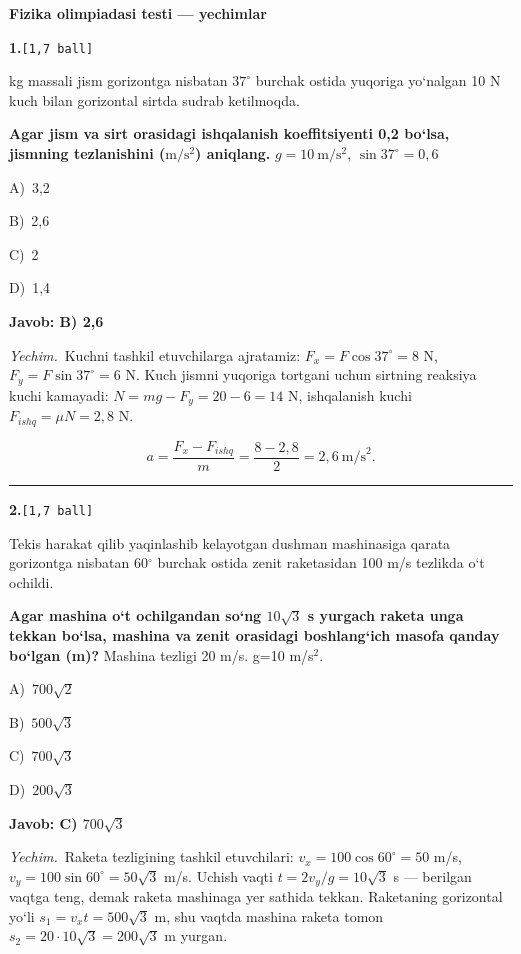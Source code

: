 \documentclass[11pt,a4paper]{article}
\newcommand{\ball}[1]{\hfill\texttt{[#1 ball]}}
\newcommand{\qhead}[2]{\Needspace{10\baselineskip}\noindent\textbf{#1.}\ball{#2}\par\nopagebreak}
\newcommand{\opt}[2]{\hspace*{8mm}#1)\ #2\par}
\newenvironment{qbody}{\begin{list}{}{\leftmargin=8mm\rightmargin=0pt\topsep=0pt\itemsep=0pt\parsep=3pt}\item\relax}{\end{list}}
\begin{document}
\begin{center}{\Large\textbf{Fizika olimpiadasi testi — yechimlar}}\end{center}\medskip
\noindent\begin{minipage}{\linewidth}
\qhead{1}{1,7}
\begin{qbody}
2 kg massali jism gorizontga nisbatan $37^\circ$ burchak ostida yuqoriga yo‘nalgan 10 N kuch bilan gorizontal sirtda sudrab ketilmoqda.\par
\textbf{Agar jism va sirt orasidagi ishqalanish koeffitsiyenti 0,2 bo‘lsa, jismning tezlanishini ($\mathrm{m/s^2}$) aniqlang.} $g=10\ \mathrm{m/s^2}$, $\sin37^\circ=0{,}6$\par
\smallskip
\opt{A}{3,2}
\opt{B}{2,6}
\opt{C}{2}
\opt{D}{1,4}
\end{qbody}\end{minipage}\par\vspace{2pt}
\noindent\colorbox{gray!12}{\parbox{\dimexpr\linewidth-2\fboxsep}{\textbf{Javob: B) 2,6}}}\par\smallskip
\noindent\textit{Yechim.}\ Kuchni tashkil etuvchilarga ajratamiz: $F_x=F\cos37^\circ=8$ N, $F_y=F\sin37^\circ=6$ N. Kuch jismni yuqoriga tortgani uchun sirtning reaksiya kuchi kamayadi: $N=mg-F_y=20-6=14$ N, ishqalanish kuchi $F_{ishq}=\mu N=2{,}8$ N.\par
\[a=\frac{F_x-F_{ishq}}{m}=\frac{8-2{,}8}{2}=2{,}6\ \text{m/s}^2.\]\par\medskip\hrule\medskip
\noindent\begin{minipage}{\linewidth}
\qhead{2}{1,7}
\begin{qbody}
Tekis harakat qilib yaqinlashib kelayotgan dushman mashinasiga qarata gorizontga nisbatan 60$^\circ$ burchak ostida zenit raketasidan 100 m/s tezlikda o‘t ochildi.\par
\textbf{Agar mashina o‘t ochilgandan so‘ng $10\sqrt3$ s yurgach raketa unga tekkan bo‘lsa, mashina va zenit orasidagi boshlang‘ich masofa qanday bo‘lgan (m)?} Mashina tezligi 20 m/s. g=10 m/s$^{2}$.\par
\smallskip
\opt{A}{$700\sqrt2$}
\opt{B}{$500\sqrt3$}
\opt{C}{$700\sqrt3$}
\opt{D}{$200\sqrt3$}
\end{qbody}\end{minipage}\par\vspace{2pt}
\noindent\colorbox{gray!12}{\parbox{\dimexpr\linewidth-2\fboxsep}{\textbf{Javob: C) $700\sqrt3$}}}\par\smallskip
\noindent\textit{Yechim.}\ Raketa tezligining tashkil etuvchilari: $v_x=100\cos60^\circ=50$ m/s, $v_y=100\sin60^\circ=50\sqrt3$ m/s. Uchish vaqti $t=2v_y/g=10\sqrt3$ s — berilgan vaqtga teng, demak raketa mashinaga yer sathida tekkan. Raketaning gorizontal yo‘li $s_1=v_xt=500\sqrt3$ m, shu vaqtda mashina raketa tomon $s_2=20\cdot10\sqrt3=200\sqrt3$ m yurgan.\par
\end{document}
